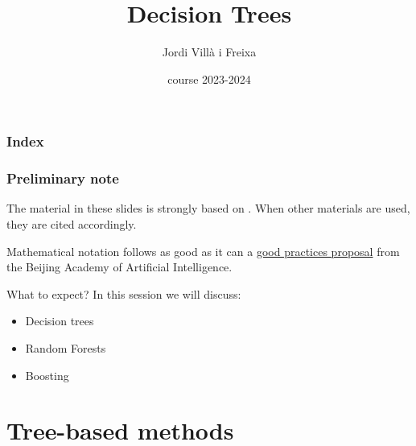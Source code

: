 \documentclass{beamer}
\title[Decision Trees]{Decision Trees} %
\author{Jordi Villà i Freixa} %
\institute[FCTE] %
{
Universitat de Vic - Universitat Central de Catalunya \\
Study Abroad\\ %
\medskip
\textit{jordi.villa@uvic.cat} %
}
\date{course 2023-2024}
\begin{document}
\begin{frame}
\titlepage %
\end{frame}

\begin{frame}
\frametitle{Index} %
\tableofcontents %
\end{frame}

\begin{frame}
  \frametitle{Preliminary note}
  The material in these slides is strongly based on \cite{kroese2020}. When other materials are used, they are cited accordingly.

  Mathematical notation follows as good as it can a \href{https://ctan.math.utah.edu/ctan/tex-archive/macros/latex/contrib/mlmath/mlmath.pdf}{good practices proposal} from the Beijing Academy of Artificial Intelligence.
  \end{frame}


\begin{frame}{What to expect?}
  In this session we will discuss:
  \begin{itemize}
    \item Decision trees
    \item Random Forests
    \item Boosting
  \end{itemize}
\end{frame}

\section{Tree-based methods}
\end{document}
